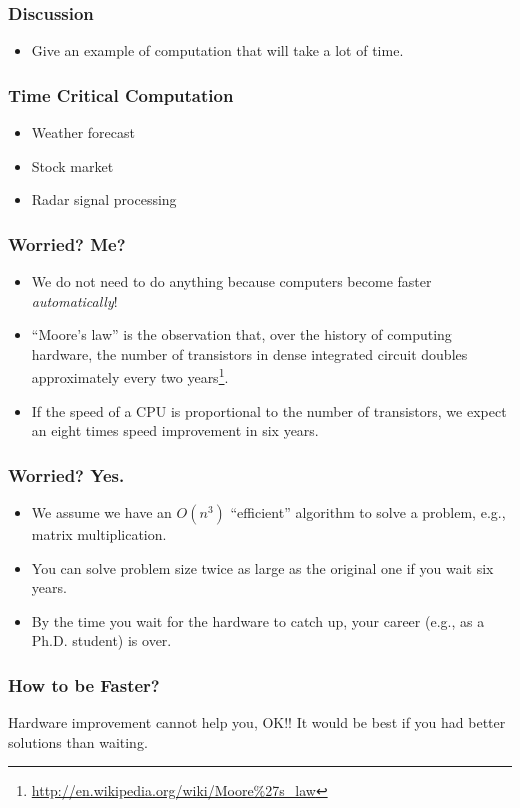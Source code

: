 \documentclass{beamer}
\begin{document}
\begin{CJK}{UTF8}{bsmi}
  \begin{frame}
    \frametitle{Discussion} \Large 
    \begin{itemize}
    \item Give an example of computation that will take a lot of time.
    \end{itemize}
  \end{frame}

  \begin{frame}
    \frametitle{Time Critical Computation}
    \begin{itemize}
    \item Weather forecast
    \item Stock market
    \item Radar signal processing
    \end{itemize}
  \end{frame}

  \begin{frame}
    \frametitle{Worried? Me?}
    \begin{itemize}
    \item We do not need to do anything because computers become faster
      {\em automatically}!
    \item ``Moore's law'' is the observation that, over the history of computing hardware, the number of transistors in dense integrated circuit doubles approximately every two years\footnote{\url{http://en.wikipedia.org/wiki/Moore\%27s_law}}.
    \item If the speed of a CPU is proportional to the number of transistors, we expect an eight times speed improvement in six years.
    \end{itemize}
  \end{frame}

  \begin{frame}
    \frametitle{Worried? Yes.}
    \begin{itemize}
    \item We assume we have an $O(n^3)$ ``efficient'' algorithm to solve a
      problem, e.g., matrix multiplication.
    \item You can solve problem size twice as large as the original one if
      you wait six years.
    \item By the time you wait for the hardware to catch up, your career
      (e.g., as a Ph.D. student) is over.
    \end{itemize}
  \end{frame}

  \begin{frame}
    \frametitle{How to be Faster?}  \Huge Hardware improvement cannot help
    you, OK!! It would be best if you had better solutions than waiting.
  \end{frame}


\end{CJK}
\end{document}
